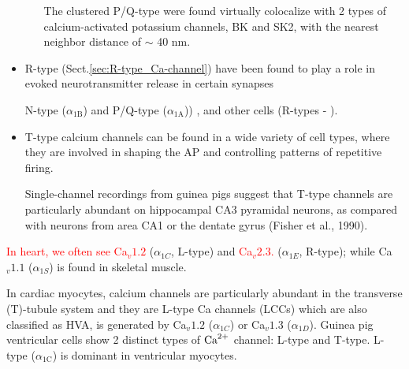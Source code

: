 \begin{itemize}
\begin{enumerate}
  The clustered P/Q-type were found virtually colocalize with 2 types of
  calcium-activated potassium channels, BK and SK2, with the nearest neighbor
  distance of $\sim$ 40 nm.
  
\end{enumerate}

 \item R-type (Sect.\ref{sec:R-type_Ca-channel}) have been found to play a role
 in evoked neurotransmitter release in certain synapses
 
  N-type ($\alpha_\text{1B}$) and P/Q-type
 ($\alpha_\text{1A}$)) , and other cells (R-types
 - ).

\item T-type calcium channels can be found in a wide variety of cell
  types, where they are involved in shaping the AP and controlling
  patterns of repetitive firing.

Single-channel recordings from guinea pigs suggest that T-type channels are
particularly abundant on hippocampal CA3 pyramidal neurons, as compared with
neurons from area CA1 or the dentate gyrus (Fisher et al., 1990).

\end{itemize}
\textcolor{red}{In heart, we often see Ca$_v1.2$} ($\alpha_{1C}$, L-type) and
\textcolor{red}{Ca$_v2.3$.} ($\alpha_{1E}$, R-type); while Ca$_v1.1$
($\alpha_{1S}$) is found in skeletal muscle.

In cardiac myocytes, calcium channels are particularly abundant in the
transverse (T)-tubule system and they are L-type Ca channels (LCCs) 
which are also classified as HVA, is generated by Ca$_v1.2$ ($\alpha_{1C}$) or
Ca$_v1.3$ ($\alpha_{1D}$). Guinea pig ventricular cells show 2 distinct types of ${\text{Ca}^{2+}}$
channel: L-type and T-type. L-type ($\alpha_\text{1C}$) is dominant in
ventricular myocytes.


% 

